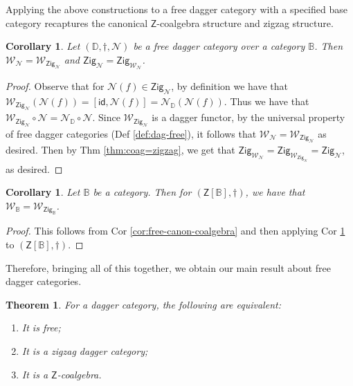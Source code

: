 \documentclass[10pt]{article}
\newtheorem{theorem}[observation]{Theorem}
\newtheorem{corollary}[observation]{Corollary}
\begin{document}
Applying the above constructions to a free dagger category with a specified base category recaptures the canonical $\mathsf{Z}$-coalgebra structure and zigzag structure. 

\begin{corollary}\label{cor:Wzig=} Let $(\mathbb{D}, \dagger, \mathcal{N})$ be a free dagger category over a category $\mathbb{B}$. Then $\mathcal{W}_\mathcal{N} = \mathcal{W}_{\mathsf{Zig}_\mathcal{N}}$ and $\mathsf{Zig}_\mathcal{N} = \mathsf{Zig}_{\mathcal{W}_\mathcal{N}}$.
\end{corollary}
\begin{proof} Observe that for $\mathcal{N}(f) \in \mathsf{Zig}_\mathcal{N}$, by definition we have that $\mathcal{W}_{\mathsf{Zig}_\mathcal{N}}\left( \mathcal{N}(f) \right) = \left[ \mathsf{id}, \mathcal{N}(f) \right] = \mathcal{N}_\mathbb{D}(\mathcal{N}(f))$. Thus we have that $\mathcal{W}_{\mathsf{Zig}_\mathcal{N}} \circ \mathcal{N} = \mathcal{N}_\mathbb{D} \circ \mathcal{N}$. Since $\mathcal{W}_{\mathsf{Zig}_\mathcal{N}}$ is a dagger functor, by the universal property of free dagger categories (Def \ref{def:dag-free}), it follows that $\mathcal{W}_\mathcal{N} = \mathcal{W}_{\mathsf{Zig}_\mathcal{N}}$ as desired. Then by Thm \ref{thm:coag=zigzag}, we get that $\mathsf{Zig}_{\mathcal{W}_\mathcal{N}} =  \mathsf{Zig}_{\mathcal{W}_{\mathsf{Zig}_\mathcal{N}}} = \mathsf{Zig}_\mathcal{N}$, as desired. 
\end{proof}

\begin{corollary} Let $\mathbb{B}$ be a category. Then for $(\mathsf{Z}[\mathbb{B}], \dagger)$, we have that $\mathcal{W}_\mathbb{B} = \mathcal{W}_{\mathsf{Zig}_\mathbb{B}}$.
\end{corollary}
\begin{proof} This follows from Cor \ref{cor:free-canon-coalgebra} and then applying Cor \ref{cor:Wzig=} to $(\mathsf{Z}[\mathbb{B}], \dagger)$. 
\end{proof}

Therefore, bringing all of this together, we obtain our main result about free dagger categories. 

\begin{theorem}\label{thm:full-free} For a dagger category, the following are equivalent: 
\begin{enumerate}[{\em (i)}]
\item It is free;
\item It is a zigzag dagger category; 
\item It is a $\mathsf{Z}$-coalgebra. 
\end{enumerate}
\end{theorem}
\end{document}
